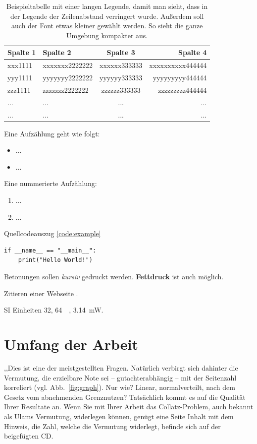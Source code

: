 \begin{table}[htb]
  \centering
  \begin{tabular}{p{2.7cm}lcr}
    \toprule
    \textbf{Spalte 1} 
    & \textbf{Spalte 2} 
    & \textbf{Spalte 3} 
    & \textbf{Spalte 4} \\
    \midrule
    xxx1111
    & xxxxxxx2222222
    & xxxxxx333333 
    & xxxxxxxxxx444444 \\

    yyy1111
    & yyyyyyy2222222
    & yyyyyy333333 
    & yyyyyyyyy444444 \\
    \addlinespace 

    zzz1111
    & zzzzzzz2222222
    & zzzzzz333333 
    & zzzzzzzzz444444 \\

    ...
    & ...
    & ...
    & ...\\
    ...
    & ...
    & ...
    & ...\\
    \bottomrule
  \end{tabular}
  \caption[Beispieltabelle mit langer Legende]{Beispieltabelle mit einer langen Legende, damit man sieht, dass in der Legende der Zeilenabstand verringert wurde. Außerdem soll auch der Font etwas kleiner gewählt werden. So sieht die ganze Umgebung kompakter aus.}
  \label{tab:tabelle_1}
\end{table}

Eine Aufzählung geht wie folgt:
\begin{itemize}
	\item ...
	\item ...
\end{itemize}
Eine nummerierte Aufzählung:
\begin{enumerate}
	\item ...
	\item ...
\end{enumerate}

Quellcodeauszug \ref{code:example}
\begin{lstlisting}[style=colorEX,language=PythonPlus,caption={Beispielcode},label={code:example}]
if __name__ == "__main__":
    print("Hello World!")
\end{lstlisting}


Betonungen sollen \emph{kursiv} gedruckt werden. 
\textbf{Fettdruck} ist auch möglich.

Zitieren einer Webseite \cite{webpage}.

SI Einheiten \SI{32}{\bit}, \SI{64}{\kilo\byte}, \SI{3.14}{\milli\watt}.


\section{Umfang der Arbeit}
,,Dies ist eine der meistgestellten Fragen. Natürlich verbirgt sich dahinter die Vermutung, die erzielbare Note sei – gutachterabhängig – mit der Seitenzahl korreliert (vgl. Abb.~\ref{fig:graph}). Nur
wie? Linear, normalverteilt, nach dem Gesetz vom abnehmenden Grenznutzen?
Tatsächlich kommt es auf die Qualität Ihrer Resultate an. Wenn Sie mit Ihrer Arbeit das Collatz-Problem, auch bekannt als Ulams Vermutung, widerlegen können, genügt eine Seite Inhalt mit dem Hinweis, die Zahl, welche die Vermutung widerlegt, befinde sich auf der beigefügten CD.

